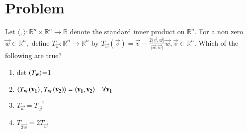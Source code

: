 \documentclass[journal,12pt]{IEEEtran}
\begin{document}
\section{\textbf{Problem}}
Let $\langle,\rangle :\mathbb{R}^n\times \mathbb{R}^n \rightarrow \mathbb{R}$  denote the standard inner product on $\mathbb{R}^{n}$. For a non zero $\vec{w} \in \mathbb{R}^n,$ define $T_\vec{w}:\mathbb{R}^n \rightarrow \mathbb{R}^n$ by $T_\vec{w}(\vec{v})=\vec{v}-\frac{2\langle \vec{v},\vec{w} \rangle}{\langle \vec{w},\vec{w} \rangle}\vec{w},\vec{v}\in \mathbb{R}^n$. Which of the following are true?\\
\begin{enumerate}
\item  det $\left(T_\mathbf{w}\right)$=1 \\
\item $\langle T_\mathbf{w}\left(\mathbf{v_1}\right),T_\mathbf{w}\left(\mathbf{v_2}\right)\rangle=\langle \mathbf{v_1},\mathbf{v_2}\rangle \quad \forall \mathbf{v_1}$ \\ 
\item  $T_\vec{w}={T_\vec{w}^{-1}}$\\
\item  $T_\vec{2w}=2T_\vec{w}$\\
\end{enumerate}
\end{document}
